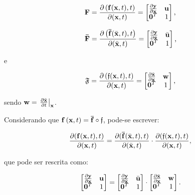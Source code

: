 \documentclass[tese_patricia]{subfiles}%
\begin{document}
\begin{equation} 
	\mathbf{F} = \frac{\partial \left(\mathbf{f}(\mathbf{x},t),t\right)}{\partial (\mathbf{x},t)}=
	\begin{bmatrix}
		\frac{\partial {\mathbf{y}}}{\partial {\mathbf{x}}} & \mathbf{u} \\
		\mathbf{0}^T & 1 \\
	\end{bmatrix}
	\text{,}
\end{equation}

\begin{equation} 
	\mathbf{\bar{F}} = \frac{\partial \left(\mathbf{\bar{f}}(\bar{\mathbf{x}},t),t\right)}{\partial (\bar{\mathbf{x}},t)}=
	\begin{bmatrix}
		\frac{\partial {\mathbf{y}}}{\partial {\bar{\mathbf{x}}}} & \bar{\mathbf{u}} \\
		\mathbf{0}^T & 1 \\
	\end{bmatrix}
	\text{,}
\end{equation}

e

\begin{equation}
	\mathfrak{F} = \frac{\partial \left({\mathfrak{f}}(\mathbf{x},t),t\right)}{\partial (\mathbf{x},t)}=
	\begin{bmatrix}
		\frac{\partial {\bar{\mathbf{x}}}}{\partial {\mathbf{x}}} & \mathbf{w} \\
		\mathbf{0}^T & 1 \\
	\end{bmatrix}
	\text{,}
\end{equation}

\noindent sendo $\mathbf{w} = \left. \frac{\partial \bar{\mathbf{x}}}{\partial t} \right|_{\mathbf{x}}$.


Considerando que $\mathbf{f}\left(\mathbf{x},t\right) = \mathbf{\bar{f}} \circ \mathfrak{f}$, pode-se escrever:

\begin{align}
	\frac{\partial(\mathbf{f}(\mathbf{x},t),t)}{\partial(\mathbf{x},t)} = \frac{\partial(\mathbf{\bar{f}}(\bar{\mathbf{x}},t),t)}{\partial(\bar{\mathbf{x}},t)} \cdot \frac{\partial(\mathfrak{f}(\mathbf{x},t),t)}{\partial(\mathbf{x},t)},
\end{align}

\noindent que pode ser rescrita como:

\begin{align}
	\begin{bmatrix}
		\frac{\partial {\mathbf{y}}}{\partial {\mathbf{x}}} & \mathbf{u} \\
		\mathbf{0}^T & 1 \\
	\end{bmatrix}
	=
	\begin{bmatrix}
		\frac{\partial {\mathbf{y}}}{\partial {\bar{\mathbf{x}}}} & \bar{\mathbf{u}} \\
		\mathbf{0}^T & 1 \\
	\end{bmatrix}
	\cdot
	\begin{bmatrix}
		\frac{\partial {\bar{\mathbf{x}}}}{\partial {\mathbf{x}}} & \mathbf{w} \\
		\mathbf{0}^T & 1 \\
	\end{bmatrix} .
\end{align}
\end{document}
